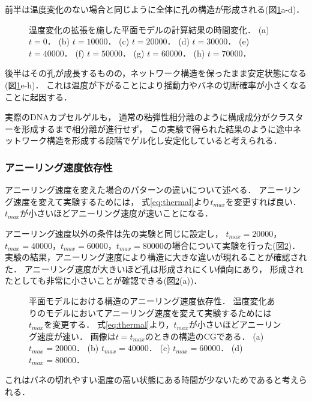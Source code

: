 前半は温度変化のない場合と同じように全体に孔の構造が形成される(図\ref{fig:result_2d_with_anearing}a-d)．
\begin{figure}
    \centering
    
    \caption{
        温度変化の拡張を施した平面モデルの計算結果の時間変化．
        (a) $t=0$．
        (b) $t=10000$．
        (c) $t=20000$．
        (d) $t=30000$．
        (e) $t=40000$．
        (f) $t=50000$．
        (g) $t=60000$．
        (h) $t=70000$．
    }
    \label{fig:result_2d_with_anearing}
\end{figure}
後半はその孔が成長するものの，ネットワーク構造を保ったまま安定状態になる(図\ref{fig:result_2d_with_anearing}e-h)．
これは温度が下がることにより揺動力やバネの切断確率が小さくなることに起因する．

実際のDNAカプセルゲルも，
通常の粘弾性相分離のように構成成分がクラスターを形成するまで相分離が進行せず，
この実験で得られた結果のように途中ネットワーク構造を形成する段階でゲル化し安定化していると考えられる．


\subsubsection{アニーリング速度依存性}
アニーリング速度を変えた場合のパターンの違いについて述べる．
アニーリング速度を変えて実験するためには，
式\ref{eq:thermal}より$t_{max}$を変更すれば良い．
$t_{max}$が小さいほどアニーリング速度が速いことになる．

アニーリング速度以外の条件は先の実験と同じに設定し，
$t_{max}=20000$，$t_{max}=40000$，$t_{max}=60000$，$t_{max}=80000$の場合について実験を行った(図\ref{fig:result_2d_anearing_speed})．
実験の結果，アニーリング速度により構造に大きな違いが現れることが確認された．
アニーリング速度が大きいほど孔は形成されにくい傾向にあり，
形成されたとしても非常に小さいことが確認できる(図\ref{fig:result_2d_anearing_speed}(a))．
\begin{figure}
    \centering
    
    \caption{
        平面モデルにおける構造のアニーリング速度依存性．
        温度変化ありのモデルにおいてアニーリング速度を変えて実験するためには$t_{max}$を変更する．
        式\ref{eq:thermal}より，$t_{max}$が小さいほどアニーリング速度が速い．
        画像は$t=t_{max}$のときの構造のCGである．
        (a) $t_{max}=20000$．
        (b) $t_{max}=40000$．
        (c) $t_{max}=60000$．
        (d) $t_{max}=80000$．
    }
    \label{fig:result_2d_anearing_speed}
\end{figure}
これはバネの切れやすい温度の高い状態にある時間が少ないためであると考えられる．

